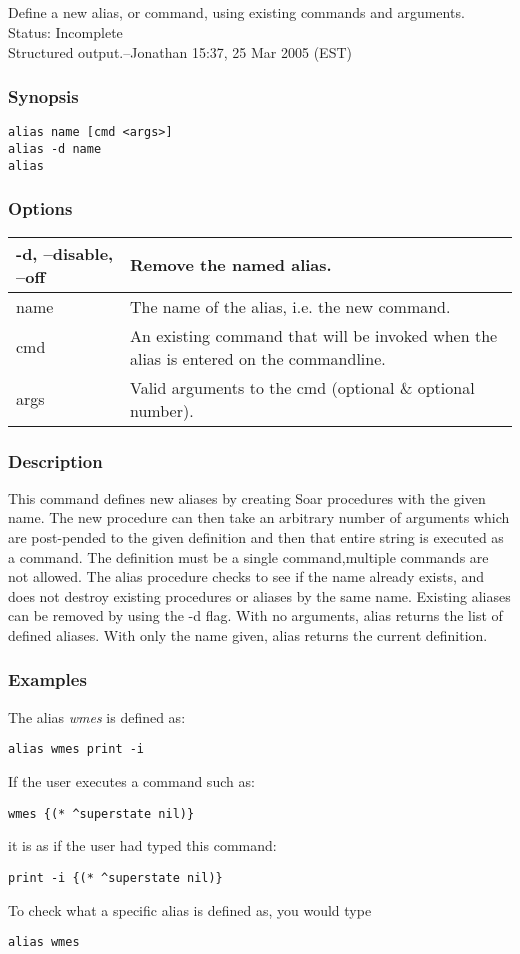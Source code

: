 \subsection{}
\label{alias}
Define a new alias, or command, using existing commands and arguments.\\ 
 Status: Incomplete\\ 
Structured output.--Jonathan 15:37, 25 Mar 2005 (EST) 
\subsubsection*{Synopsis}
  \begin{verbatim}
alias name [cmd <args>]
alias -d name
alias
\end{verbatim}
\subsubsection*{Options}
\begin{tabular}{|l|l|}
\hline 
 -d, --disable, --off  & Remove the named alias.  \\
 \hline 
 name  & The name of the alias, i.e. the new command.  \\
 \hline 
 cmd  & An existing command that will be invoked when the alias is entered on the commandline.  \\
 \hline 
 args  & Valid arguments to the cmd (optional \& optional number).  \\
 \hline 
\end{tabular}
\subsubsection*{Description}
 This command defines new aliases by creating Soar procedures with the given name. The new procedure can then take an arbitrary number of arguments which are post-pended to the given definition and then that entire string is executed as a command. The definition must be a single command,multiple commands are not allowed. The alias procedure checks to see if the name already exists, and does not destroy existing procedures or aliases by the same name. Existing aliases can be removed by using the -d flag. With no arguments, alias returns the list of defined aliases. With only the name given, alias returns the current definition. 
\subsubsection*{Examples}
 The alias \emph{wmes}
 is defined as: \begin{verbatim}
alias wmes print -i
\end{verbatim}
 If the user executes a command such as: \begin{verbatim}
wmes {(* ^superstate nil)}
\end{verbatim}
 it is as if the user had typed this command: \begin{verbatim}
print -i {(* ^superstate nil)}
\end{verbatim}
 To check what a specific alias is defined as, you would type \begin{verbatim}
alias wmes
\end{verbatim}
